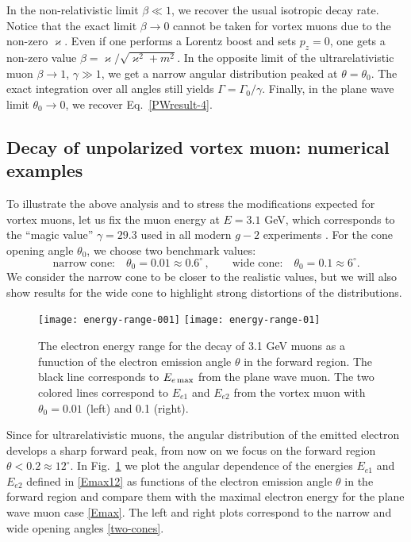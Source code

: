 \documentclass[aps,prd,longbibliography,nofootinbib,amsthm,amsmath,amssymb,amsfonts,notitlepage]{revtex4-1}
\begin{document}
In the non-relativistic limit $\beta \ll 1$, we recover the usual isotropic decay rate.
Notice that the exact limit $\beta \to 0$ cannot be taken for vortex muons due to the non-zero $\varkappa$.
Even if one performs a Lorentz boost and sets $p_z=0$, one gets a non-zero value $\beta = \varkappa/\sqrt{\varkappa^2+m^2}$.
In the opposite limit of the ultrarelativistic muon $\beta \rightarrow 1$, $\gamma \gg 1$, we get
a narrow angular distribution peaked at $\theta = \theta_0$. The exact integration
over all angles still yields $\Gamma = \Gamma_0/\gamma$.
Finally, in the plane wave limit $\theta_0 \to 0$, we recover Eq.~\eqref{PWresult-4}.

\subsection{Decay of unpolarized vortex muon: numerical examples}

To illustrate the above analysis and to stress the modifications expected for vortex muons,
let us fix the muon energy at $E = 3.1$ GeV, which corresponds to the ``magic value'' $\gamma = 29.3$
used in all modern $g-2$ experiments \cite{Miller:2007kk, Logashenko:2018pcl}.
For the cone opening angle $\theta_0$, we choose two benchmark values:
\begin{equation}
\mbox{narrow cone:}\quad \theta_0 = 0.01 \approx 0.6^\circ\,, \qquad
\mbox{wide cone:} \quad \theta_0 = 0.1 \approx 6^\circ.
\label{two-cones}
\end{equation}
We consider the narrow cone to be closer to the realistic values, but we will also show results
for the wide cone to highlight strong distortions of the distributions.

\begin{figure}[!h]
	\centering
	\texttt{[image: energy-range-001]}\hfill
	\texttt{[image: energy-range-01]}
	\caption{The electron energy range for the decay of 3.1 GeV muons as a funuction of the electron emission angle $\theta$ in the forward region.
		The black line corresponds to $E_{e\,\rm max}$ from the plane wave muon.
		The two colored lines correspond to $E_{e1}$ and $E_{e2}$ from the vortex muon with
		$\theta_0 = 0.01$ (left) and 0.1 (right).}\label{Fig-Emax}
\end{figure}

Since for ultrarelativistic muons, the angular distribution of the emitted electron develops a sharp forward peak,
from now on we focus on the forward region $\theta < 0.2 \approx 12^\circ$.
In Fig.~\ref{Fig-Emax} we plot the angular dependence of the energies $E_{e1}$ and $E_{e2}$ defined in \eqref{Emax12}
as functions of the electron emission angle $\theta$ in the forward region and compare them with the maximal electron energy
for the plane wave muon case \eqref{Emax}.
The left and right plots correspond to the narrow and wide opening angles \eqref{two-cones}.
\end{document}

